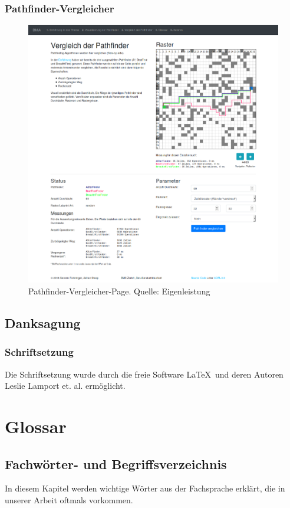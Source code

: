 \documentclass[12pt,a4paper,german]{report}
\begin{document}
\subsection{Pathfinder-Vergleicher}
\begin{figure}[h]
  \centering
  \includegraphics[width=14cm]{3_full}
  \caption[Ein vollständiger Screenshot des Pathfinder-Vergleichers.]{Pathfinder-Vergleicher-Page. Quelle: Eigenleistung}
  \label{fig:comparator_screenshot}
\end{figure}

\section{Danksagung}
\blindtext

\subsection{Schriftsetzung}
Die Schriftsetzung wurde durch die freie Software \LaTeX\  und deren Autoren Leslie Lamport et. al. ermöglicht.

\chapter{Glossar}
\section*{Fachwörter- und Begriffsverzeichnis}
In diesem Kapitel werden wichtige Wörter aus der Fachsprache erklärt, die in unserer Arbeit oftmals vorkommen.
\end{document}
